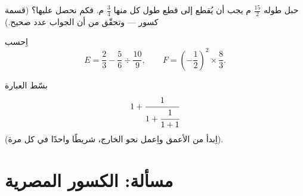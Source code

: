 \begin{exercise}[$\star\star$]\label{exo:g8:fractions:10}
حبل طوله $\frac{15}{2}$ م يجب أن يُقطع إلى قطع طول كل منها $\frac{3}{4}$ م.
فكم  نحصل عليها؟ (قسمة كسور ---
وتحقّق من أن الجواب عدد صحيح.)
\end{exercise}

\begin{exercise}[$\star\star$]\label{exo:g8:fractions:11}
اِحسب
\[
E = \frac{2}{3} - \frac{5}{6} \div \frac{10}{9},
\qquad
F = \left(-\frac{1}{2}\right)^2 \times \frac{8}{3} .
\]
\end{exercise}

\begin{exercise}[$\star\star\star$]\label{exo:g8:fractions:12}
بسّط العبارة
\[
1 + \cfrac{1}{1 + \cfrac{1}{1 + 1}}
\]
(اِبدأ من  الأعمق واِعمل نحو الخارج، شريطًا واحدًا في كل
مرة).
\end{exercise}

\section{مسألة: الكسور المصرية}


